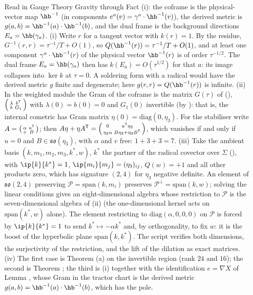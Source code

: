 Read in Gauge Theory Gravity through Fact (i): the coframe is the physical-vector map $\hb^{-1}$ (in components $e^a(v) = \gamma^a\cdot\hb^{-1}(v)$), the derived metric is $g(a,b) = \hb^{-1}(a)\cdot\hb^{-1}(b)$, and the dual frame is the background directions $E_a = \hb(\gamma_a)$. (i) Write $r$ for a tangent vector with $k(r) = 1$. By the residue, $G^{-1}(r, r) = \tau^{-1}/T + O(1)$, so $Q(\hb^{-1}(r)) = \tau^{-1}/T + O(1)$, and at least one component $\gamma^a\cdot\hb^{-1}(r)$ of the physical vector $\hb^{-1}(r)$ is of order $\tau^{-1/2}$. The dual frame $E_a = \hb(\gamma_a)$ then has $k(E_a) = O(\tau^{1/2})$ for that $a$: its image collapses into $\ker k$ at $\tau = 0$. A soldering form with a radical would have the derived metric $g$ finite and degenerate; here $g(r,r) = Q(\hb^{-1}(r))$ is infinite. (ii) In the weighted module the Gram of the coframe is the matrix $G(\tau)$ of \cite[proof of Thm.~6.2]{ButlerT4} (), $\begin{psmallmatrix}\lambda & b^{\mathsf T}\\ b & G_1\end{psmallmatrix}$ with $\lambda(0) = b(0) = 0$ and $G_1(0)$ invertible (by ): that is, the internal cometric has Gram matrix $\eta(0) = \mathrm{diag}(0, \eta_3)$. For the stabiliser write $A = \begin{psmallmatrix}\alpha & u^{\mathsf T}\\ v & B\end{psmallmatrix}$; then $A\eta + \eta A^{\mathsf T} = \begin{psmallmatrix} 0 & u^{\mathsf T}\eta_3\\ \eta_3 u & B\eta_3 + \eta_3 B^{\mathsf T}\end{psmallmatrix}$, which vanishes if and only if $u = 0$ and $B \in \mathfrak{so}(\eta_3)$, with $\alpha$ and $v$ free: $1 + 3 + 3 = 7$. (iii) Take the ambient basis $(k, m_1, m_2, m_3, k^*, w)$, $k^*$ the partner of the radical covector over $\Sigma$ (), with $\ip{k}{k^*} = 1$, $\ip{m_i}{m_j} = (\eta_3)_{ij}$, $Q(w) = +1$ and all other products zero, which has signature $(2,4)$ for $\eta_3$ negative definite. An element of $\mathfrak{so}(2,4)$ preserving $\mathcal{P} = \mathrm{span}(k, m_i)$ preserves $\mathcal{P}^\perp = \mathrm{span}(k, w)$; solving the linear conditions gives an eight-dimensional algebra whose restriction to $\mathcal{P}$ is the seven-dimensional algebra of (ii) (the one-dimensional kernel acts on $\mathrm{span}(k^*, w)$ alone). The element restricting to $\mathrm{diag}(\alpha, 0, 0, 0)$ on $\mathcal{P}$ is forced by $\ip{k}{k^*} = 1$ to send $k^* \mapsto -\alpha k^*$ and, by orthogonality, to fix $w$: it is the boost of the hyperbolic plane $\mathrm{span}(k, k^*)$. The script verifies both dimensions, the surjectivity of the restriction, and the lift of the dilation as exact matrices. (iv) The first case is Theorem (a) on the invertible region (rank $24$ and $16$); the second is Theorem ; the third is (i) together with the identification $e = \nabla X$ of Lemma , whose Gram in the tractor chart is the derived metric $g(a,b) = \hb^{-1}(a)\cdot\hb^{-1}(b)$, which has the pole.
